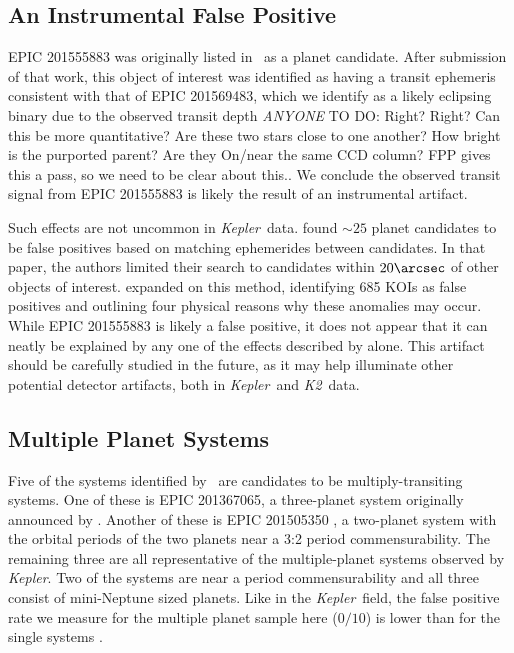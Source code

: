 \documentclass{emulateapj}
\newcommand{\project}[1]{\textsl{#1}}
\newcommand{\kep}{\project{Kepler}}
\newcommand{\KT}{\project{K2}}
\newcommand{\paperit}{\citet{Foreman-Mackey15}}
\newcommand{\todo}[3]{{\color{#2} \emph{#1} TO DO: #3}}
\newcommand{\anytodo}[1]{\todo{ANYONE}{NavyBlue}{#1}}
\begin{document}
\subsection{An Instrumental False Positive}

EPIC 201555883 was originally listed in \paperit\ as a planet candidate.
After submission of that work, this object of interest was identified as
having a transit ephemeris consistent with that of EPIC 201569483,
which we identify as a likely eclipsing binary due to the observed transit
depth \anytodo{Right? Right?  Can this be more quantitative?  Are these two stars 
close to one another?  How bright is  the purported parent? Are they 
On/near the same CCD column?  FPP gives this a pass, so we 
need to be clear about this.}.
We conclude the observed transit signal from EPIC 201555883 is likely the result
of an instrumental artifact.

Such effects are not uncommon in \kep\ data.
\citet{Batalha13} found $\sim 25$ planet candidates to be false positives based on matching
ephemerides between candidates.
In that paper, the authors limited their search to candidates within $20\arcsec$ of other
objects of interest.
\citet{Coughlin14} expanded on this method, identifying 685 KOIs as false positives and
outlining four physical reasons why these anomalies may occur.
While EPIC 201555883 is likely a false positive, it does not appear that it can neatly be
explained by any one of the effects described by \citet{Coughlin14} alone.
This artifact should be carefully studied in the future, as it may help illuminate other
potential detector artifacts, both in \kep\ and \KT\ data.


\subsection{Multiple Planet Systems}
Five of the systems identified by \paperit\ are candidates to be multiply-transiting
systems.
One of these is EPIC 201367065, a three-planet system originally announced by
\citet{Crossfield15}.
Another of these is EPIC 201505350 \citep{Armstrong15b}, a two-planet system with the
orbital periods of the two planets near a 3:2 period commensurability.
The remaining three are all representative of the multiple-planet systems observed by
\kep \citep{Lissauer11b, Fabrycky14}.
Two of the systems are near a period commensurability and all three consist of
mini-Neptune sized planets.
Like in the \kep\ field, the false positive rate we measure for the multiple planet sample
here ($0/10$) is lower than for the single systems \citep{Lissauer12, Rowe14}.
\end{document}

